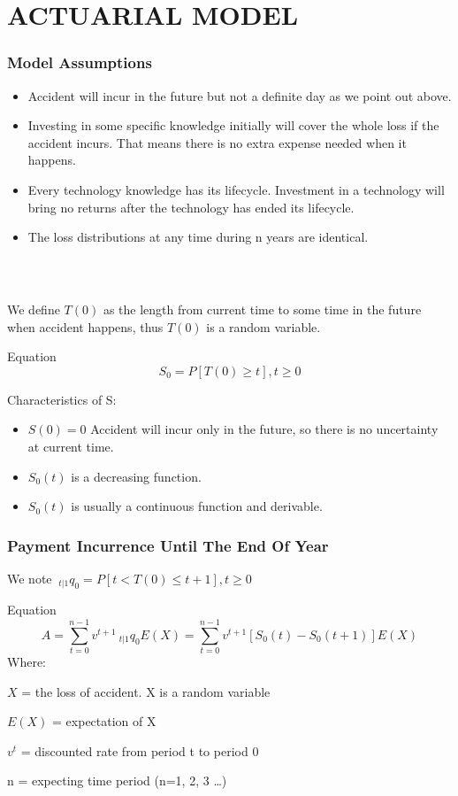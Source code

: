 \documentclass[slidestop,compress,mathserif,table]{beamer}
\begin{document}
\section{ACTUARIAL MODEL}

\begin{frame}
  \frametitle{Model Assumptions}
  \begin{itemize}
  \item Accident will incur in the future but not a definite day as we
    point out above.
    \item Investing in some specific knowledge initially will cover
      the whole loss if the accident incurs. That means there is no
      extra expense needed when it happens.
      \item Every technology knowledge has its lifecycle. Investment in a
        technology will bring no returns after the technology has
        ended its lifecycle.
        \item The loss distributions at any time during n years are identical.
  \end{itemize}
\end{frame}

\begin{frame}
  \frametitle{\ }
We define $T(0)$ as the length from current time to some time in the
future when accident happens, thus $T(0)$ is a random variable.
\begin{exampleblock}{Equation}
  \begin{equation}
    S_0=P[T(0)\ge t], t \ge 0
  \end{equation}
\end{exampleblock}
Characteristics of S:
\begin{itemize}
\item $S(0)=0$ Accident will incur only in the future, so there is no
  uncertainty at current time.
  \item $S_0(t)$ is a decreasing function.
    \item  $S_0(t)$ is usually a continuous function and derivable.
\end{itemize}
\end{frame}


\begin{frame}
  \frametitle{Payment Incurrence Until The End Of Year}

We note $ \ _{t|1}q_0=P[t<T(0) \le t+1], t \ge 0 $
  \begin{exampleblock}{Equation}
    \begin{equation}
      A=\sum_{t=0}^{n-1}v^{t+1} \ _{t|1}q_0E(X)=\sum_{t=0}^{n-1}v^{t+1}[S_0(t)-S_0(t+1)]E(X)
    \end{equation}
Where:

$X$ = the loss of accident. X is a random variable

$E(X)$ = expectation of X

$v^t$ = discounted rate from period t to period 0

n = expecting  time period (n=1, 2, 3 \ldots)
  \end{exampleblock}
\end{frame}
\end{document}

